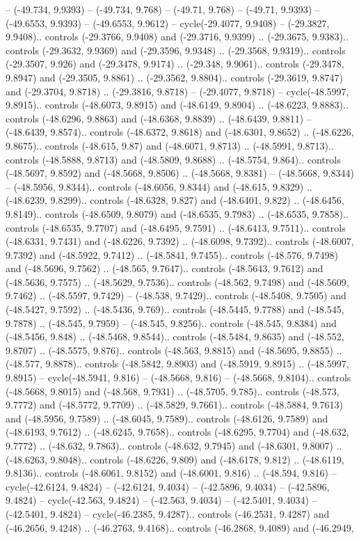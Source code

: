 \begin{scope}[shift={(2.5552, 9.9912)}]
\begin{scope}[shift={(48.1654, -14.8546)}]
-- (-49.734, 9.9393) -- (-49.734, 9.768) -- (-49.71, 9.768) -- (-49.71, 9.9393) -- (-49.6553, 9.9393) -- (-49.6553, 9.9612) -- cycle(-29.4077, 9.9408) -- (-29.3827, 9.9408).. controls (-29.3766, 9.9408) and (-29.3716, 9.9399) .. (-29.3675, 9.9383).. controls (-29.3632, 9.9369) and (-29.3596, 9.9348) .. (-29.3568, 9.9319).. controls (-29.3507, 9.926) and (-29.3478, 9.9174) .. (-29.348, 9.9061).. controls (-29.3478, 9.8947) and (-29.3505, 9.8861) .. (-29.3562, 9.8804).. controls (-29.3619, 9.8747) and (-29.3704, 9.8718) .. (-29.3816, 9.8718) -- (-29.4077, 9.8718) -- cycle(-48.5997, 9.8915).. controls (-48.6073, 9.8915) and (-48.6149, 9.8904) .. (-48.6223, 9.8883).. controls (-48.6296, 9.8863) and (-48.6368, 9.8839) .. (-48.6439, 9.8811) -- (-48.6439, 9.8574).. controls (-48.6372, 9.8618) and (-48.6301, 9.8652) .. (-48.6226, 9.8675).. controls (-48.615, 9.87) and (-48.6071, 9.8713) .. (-48.5991, 9.8713).. controls (-48.5888, 9.8713) and (-48.5809, 9.8688) .. (-48.5754, 9.864).. controls (-48.5697, 9.8592) and (-48.5668, 9.8506) .. (-48.5668, 9.8381) -- (-48.5668, 9.8344) -- (-48.5956, 9.8344).. controls (-48.6056, 9.8344) and (-48.615, 9.8329) .. (-48.6239, 9.8299).. controls (-48.6328, 9.827) and (-48.6401, 9.822) .. (-48.6456, 9.8149).. controls (-48.6509, 9.8079) and (-48.6535, 9.7983) .. (-48.6535, 9.7858).. controls (-48.6535, 9.7707) and (-48.6495, 9.7591) .. (-48.6413, 9.7511).. controls (-48.6331, 9.7431) and (-48.6226, 9.7392) .. (-48.6098, 9.7392).. controls (-48.6007, 9.7392) and (-48.5922, 9.7412) .. (-48.5841, 9.7455).. controls (-48.576, 9.7498) and (-48.5696, 9.7562) .. (-48.565, 9.7647).. controls (-48.5643, 9.7612) and (-48.5636, 9.7575) .. (-48.5629, 9.7536).. controls (-48.562, 9.7498) and (-48.5609, 9.7462) .. (-48.5597, 9.7429) -- (-48.538, 9.7429).. controls (-48.5408, 9.7505) and (-48.5427, 9.7592) .. (-48.5436, 9.769).. controls (-48.5445, 9.7788) and (-48.545, 9.7878) .. (-48.545, 9.7959) -- (-48.545, 9.8256).. controls (-48.545, 9.8384) and (-48.5456, 9.848) .. (-48.5468, 9.8544).. controls (-48.5484, 9.8635) and (-48.552, 9.8707) .. (-48.5575, 9.876).. controls (-48.563, 9.8815) and (-48.5695, 9.8855) .. (-48.577, 9.8878).. controls (-48.5842, 9.8903) and (-48.5919, 9.8915) .. (-48.5997, 9.8915) -- cycle(-48.5941, 9.816) -- (-48.5668, 9.816) -- (-48.5668, 9.8104).. controls (-48.5668, 9.8015) and (-48.568, 9.7931) .. (-48.5705, 9.785).. controls (-48.573, 9.7772) and (-48.5772, 9.7709) .. (-48.5829, 9.7661).. controls (-48.5884, 9.7613) and (-48.5956, 9.7589) .. (-48.6045, 9.7589).. controls (-48.6126, 9.7589) and (-48.6193, 9.7612) .. (-48.6245, 9.7658).. controls (-48.6295, 9.7704) and (-48.632, 9.7772) .. (-48.632, 9.7863).. controls (-48.632, 9.7945) and (-48.6301, 9.8007) .. (-48.6263, 9.8048).. controls (-48.6226, 9.809) and (-48.6178, 9.812) .. (-48.6119, 9.8136).. controls (-48.6061, 9.8152) and (-48.6001, 9.816) .. (-48.594, 9.816) -- cycle(-42.6124, 9.4824) -- (-42.6124, 9.4034) -- (-42.5896, 9.4034) -- (-42.5896, 9.4824) -- cycle(-42.563, 9.4824) -- (-42.563, 9.4034) -- (-42.5401, 9.4034) -- (-42.5401, 9.4824) -- cycle(-46.2385, 9.4287).. controls (-46.2531, 9.4287) and (-46.2656, 9.4248) .. (-46.2763, 9.4168).. controls (-46.2868, 9.4089) and (-46.2949, 
\end{scope}
\end{scope}
